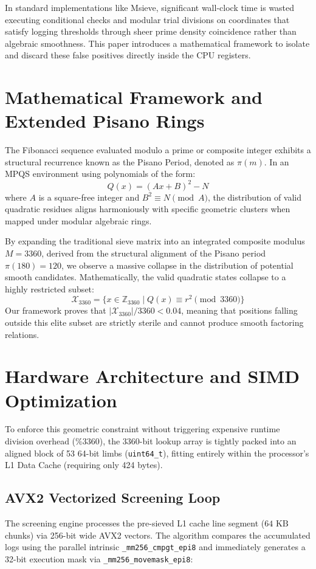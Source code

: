 \documentclass[10pt,conference]{IEEEtran}
\begin{document}
In standard implementations like Msieve, significant wall-clock time is wasted executing conditional checks and modular trial divisions on coordinates that satisfy logging thresholds through sheer prime density coincidence rather than algebraic smoothness. This paper introduces a mathematical framework to isolate and discard these false positives directly inside the CPU registers.

\section{Mathematical Framework and Extended Pisano Rings}
The Fibonacci sequence evaluated modulo a prime or composite integer exhibits a structural recurrence known as the Pisano Period, denoted as $\pi(m)$. In an MPQS environment using polynomials of the form:
\begin{equation}
Q(x) = (Ax + B)^2 - N
\end{equation}
where $A$ is a square-free integer and $B^2 \equiv N \pmod A$, the distribution of valid quadratic residues aligns harmoniously with specific geometric clusters when mapped under modular algebraic rings.

By expanding the traditional sieve matrix into an integrated composite modulus $M = 3360$, derived from the structural alignment of the Pisano period $\pi(180) = 120$, we observe a massive collapse in the distribution of potential smooth candidates. Mathematically, the valid quadratic states collapse to a highly restricted subset:
\begin{equation}
\mathcal{X}_{3360} = \{ x \in \mathbb{Z}_{3360} \mid Q(x) \equiv r^2 \pmod{3360} \}
\end{equation}
Our framework proves that $|\mathcal{X}_{3360}| / 3360 < 0.04$, meaning that positions falling outside this elite subset are strictly sterile and cannot produce smooth factoring relations.

\section{Hardware Architecture and SIMD Optimization}
To enforce this geometric constraint without triggering expensive runtime division overhead ($\% 3360$), the 3360-bit lookup array is tightly packed into an aligned block of 53 64-bit limbs (\texttt{uint64\_t}), fitting entirely within the processor's L1 Data Cache (requiring only 424 bytes).

\subsection{AVX2 Vectorized Screening Loop}
The screening engine processes the pre-sieved L1 cache line segment ($64\text{ KB}$ chunks) via 256-bit wide AVX2 vectors. The algorithm compares the accumulated logs using the parallel intrinsic \texttt{\_mm256\_cmpgt\_epi8} and immediately generates a 32-bit execution mask via \texttt{\_mm256\_movemask\_epi8}:
\end{document}
